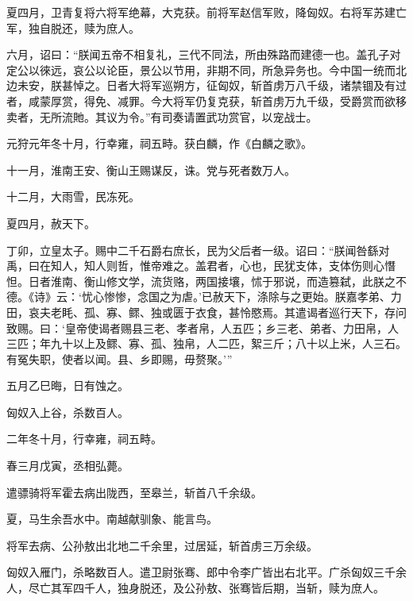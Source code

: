\documentclass[12pt,UTF8]{ctexbook}
\begin{document}
夏四月，卫青复将六将军绝幕，大克获。前将军赵信军败，降匈奴。右将军苏建亡军，独自脱还，赎为庶人。



六月，诏曰：“朕闻五帝不相复礼，三代不同法，所由殊路而建德一也。盖孔子对定公以徠远，哀公以论臣，景公以节用，非期不同，所急异务也。今中国一统而北边未安，朕甚悼之。日者大将军巡朔方，征匈奴，斩首虏万八千级，诸禁锢及有过者，咸蒙厚赏，得免、减罪。今大将军仍复克获，斩首虏万九千级，受爵赏而欲移卖者，无所流貤。其议为令。”有司奏请置武功赏官，以宠战士。



元狩元年冬十月，行幸雍，祠五畤。获白麟，作《白麟之歌》。



十一月，淮南王安、衡山王赐谋反，诛。党与死者数万人。



十二月，大雨雪，民冻死。



夏四月，赦天下。



丁卯，立皇太子。赐中二千石爵右庶长，民为父后者一级。诏曰：“朕闻咎繇对禹，曰在知人，知人则哲，惟帝难之。盖君者，心也，民犹支体，支体伤则心憯怛。日者淮南、衡山修文学，流货赂，两国接壤，怵于邪说，而造篡弑，此朕之不德。《诗》云：‘忧心惨惨，念国之为虐。’已赦天下，涤除与之更始。朕嘉孝弟、力田，哀夫老眊、孤、寡、鳏、独或匮于衣食，甚怜愍焉。其遣谒者巡行天下，存问致赐。曰：‘皇帝使谒者赐县三老、孝者帛，人五匹；乡三老、弟者、力田帛，人三匹；年九十以上及鳏、寡、孤、独帛，人二匹，絮三斤；八十以上米，人三石。有冤失职，使者以闻。县、乡即赐，毋赘聚。’”



五月乙巳晦，日有蚀之。



匈奴入上谷，杀数百人。



二年冬十月，行幸雍，祠五畤。



春三月戊寅，丞相弘薨。



遣骠骑将军霍去病出陇西，至皋兰，斩首八千余级。



夏，马生余吾水中。南越献驯象、能言鸟。



将军去病、公孙敖出北地二千余里，过居延，斩首虏三万余级。



匈奴入雁门，杀略数百人。遣卫尉张骞、郎中令李广皆出右北平。广杀匈奴三千余人，尽亡其军四千人，独身脱还，及公孙敖、张骞皆后期，当斩，赎为庶人。
\end{document}
